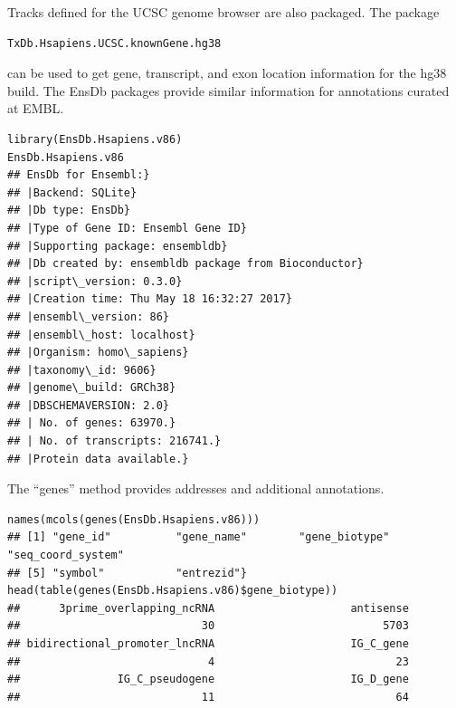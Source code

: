 Tracks defined for the UCSC genome browser are also
packaged. The package 
\begin{verbatim}
TxDb.Hsapiens.UCSC.knownGene.hg38 
\end{verbatim} 
can be
used to get gene, transcript, and exon location information
for the hg38 build. The EnsDb packages provide similar
information for annotations curated at EMBL.


\begin{shaded}
\begin{verbatim}
library(EnsDb.Hsapiens.v86)
EnsDb.Hsapiens.v86
## EnsDb for Ensembl:}
## |Backend: SQLite}
## |Db type: EnsDb}
## |Type of Gene ID: Ensembl Gene ID}
## |Supporting package: ensembldb}
## |Db created by: ensembldb package from Bioconductor}
## |script\_version: 0.3.0}
## |Creation time: Thu May 18 16:32:27 2017}
## |ensembl\_version: 86}
## |ensembl\_host: localhost}
## |Organism: homo\_sapiens}
## |taxonomy\_id: 9606}
## |genome\_build: GRCh38}
## |DBSCHEMAVERSION: 2.0}
## | No. of genes: 63970.}
## | No. of transcripts: 216741.}
## |Protein data available.}
\end{verbatim}
\end{shaded}


The ``genes'' method provides addresses and additional
annotations.

\begin{shaded}
\begin{verbatim}
names(mcols(genes(EnsDb.Hsapiens.v86)))
## [1] "gene_id"          "gene_name"        "gene_biotype"     "seq_coord_system"
## [5] "symbol"           "entrezid"}
head(table(genes(EnsDb.Hsapiens.v86)$gene_biotype))
##      3prime_overlapping_ncRNA                     antisense 
##                            30                          5703 
## bidirectional_promoter_lncRNA                     IG_C_gene 
##                             4                            23 
##               IG_C_pseudogene                     IG_D_gene 
##                            11                            64
\end{verbatim}
\end{shaded}

